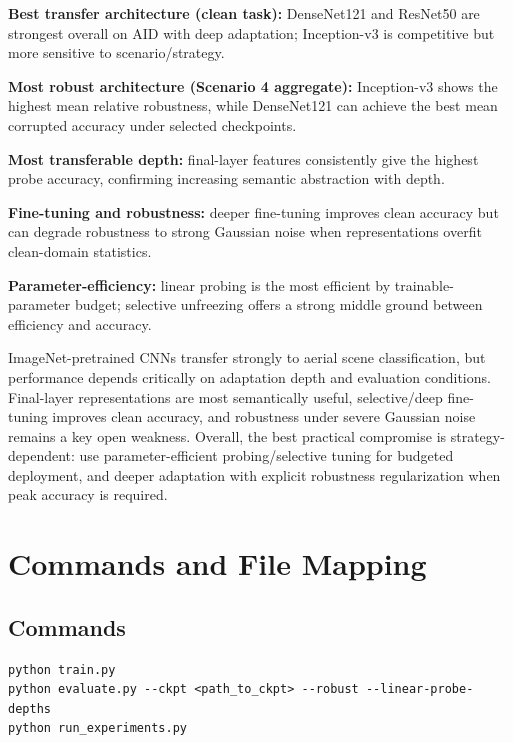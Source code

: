 \documentclass[11pt,a4paper]{report}
\renewenvironment{leftbar}[1][\hsize]
  {\def\FrameCommand{{\color{subsectionblue}\vrule width 3pt}\hspace{0pt}}%
   \MakeFramed{\hsize#1\advance\hsize-\width\FrameRestore}}
  {\endMakeFramed}
\renewenvironment{itemize}{\begin{leftbar}\begin{originalitemize}}{\end{originalitemize}\end{leftbar}}
\begin{document}
\begin{itemize}
  \item \textbf{Best transfer architecture (clean task):} DenseNet121 and ResNet50 are strongest overall on AID with deep adaptation; Inception-v3 is competitive but more sensitive to scenario/strategy.
  \item \textbf{Most robust architecture (Scenario 4 aggregate):} Inception-v3 shows the highest mean relative robustness, while DenseNet121 can achieve the best mean corrupted accuracy under selected checkpoints.
  \item \textbf{Most transferable depth:} final-layer features consistently give the highest probe accuracy, confirming increasing semantic abstraction with depth.
  \item \textbf{Fine-tuning and robustness:} deeper fine-tuning improves clean accuracy but can degrade robustness to strong Gaussian noise when representations overfit clean-domain statistics.
  \item \textbf{Parameter-efficiency:} linear probing is the most efficient by trainable-parameter budget; selective unfreezing offers a strong middle ground between efficiency and accuracy.
\end{itemize}

\begin{tcolorbox}[
  colback=LightGray,
  colframe=black!40,
  boxrule=0.6pt,
  arc=2pt,
  left=4pt,
  right=4pt,
  top=6pt,
  bottom=6pt,
  breakable=false,
  title=\textbf{Final Summary},
  coltitle=black,
  colbacktitle=LightGray,
  fonttitle=\bfseries,
]
\color{black}%
ImageNet-pretrained CNNs transfer strongly to aerial scene classification, but performance depends critically on adaptation depth and evaluation conditions. Final-layer representations are most semantically useful, selective/deep fine-tuning improves clean accuracy, and robustness under severe Gaussian noise remains a key open weakness. Overall, the best practical compromise is strategy-dependent: use parameter-efficient probing/selective tuning for budgeted deployment, and deeper adaptation with explicit robustness regularization when peak accuracy is required.
\end{tcolorbox}

\appendix
\chapter{Commands and File Mapping}

\section{Commands}
\begin{verbatim}
python train.py
python evaluate.py --ckpt <path_to_ckpt> --robust --linear-probe-depths
python run_experiments.py
\end{verbatim}
\end{document}
